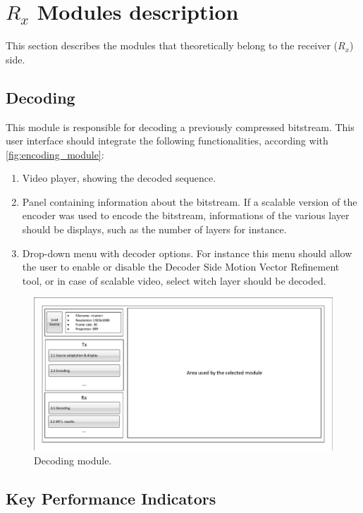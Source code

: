\documentclass{article}
\begin{document}
\section{$R_x$ Modules description}

This section describes the modules that theoretically belong to the receiver ($R_x$) side.


\subsection{Decoding}

This module is responsible for decoding a previously compressed bitstream. This user interface should integrate the following functionalities, according with \cref{fig:encoding_module}:

\begin{enumerate}
    \item Video player, showing the decoded sequence.
    \item Panel containing information about the bitstream. If a scalable version of the encoder was used to encode the bitstream, informations of the various layer should be displays, such as the number of layers for instance.
    \item Drop-down menu with decoder options. For instance this menu should allow the user to enable or disable the Decoder Side Motion Vector Refinement tool, or in case of scalable video, select witch layer should be decoded.
\end{enumerate}

\begin{figure}[h!]
    \centering
    \includegraphics[page=5,width=1\textwidth]{Drawings.pdf}
    \caption{Decoding module.}
    \label{fig:decoding_module}
\end{figure}

\subsection{Key Performance Indicators}
\end{document}
